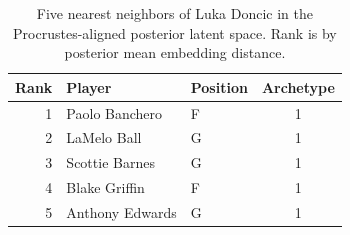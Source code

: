\begin{table}[htbp]
  \centering\small
  \begin{tabular}{rllc}
    \toprule
    Rank & Player & Position & Archetype \\
    \midrule
    1 & Paolo Banchero & F & 1 \\
    2 & LaMelo Ball & G & 1 \\
    3 & Scottie Barnes & G & 1 \\
    4 & Blake Griffin & F & 1 \\
    5 & Anthony Edwards & G & 1 \\
    \bottomrule
  \end{tabular}
  \caption{Five nearest neighbors of Luka Doncic in the Procrustes-aligned posterior latent space. Rank is by posterior mean embedding distance.}
  \label{tab:Luka_Doncic_neighbors}
\end{table}

